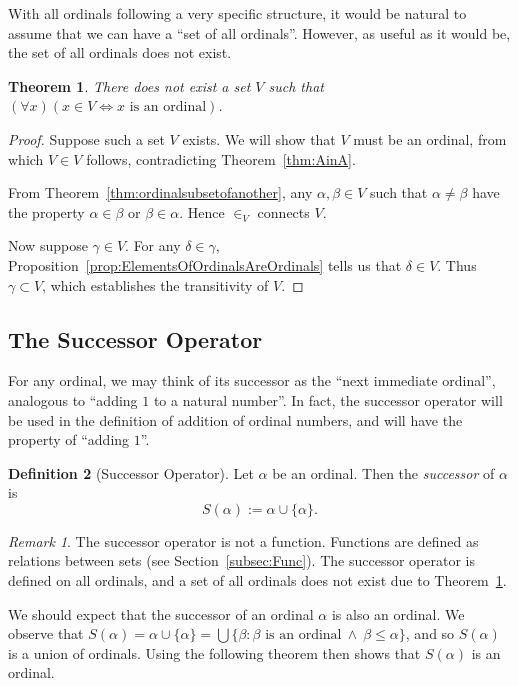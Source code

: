 \documentclass[a4paper,11pt]{article}
\theoremstyle{plain}
\newtheorem{thm}{Theorem}[subsection]
\theoremstyle{definition}
\newtheorem{defn}[thm]{Definition}
\theoremstyle{remark}
\newtheorem*{rem}{Remark}
\begin{document}
With all ordinals following a very specific structure, it would be natural to assume that we can have a ``set of all ordinals''. However, as useful as it would be, the set of all ordinals does not exist.

\begin{thm}
\label{thm:NoOrdinalSet}
There does not exist a set $V$ such that $(\forall x)(x\in V \iff x \text{ is an ordinal})$.
\end{thm}
\begin{proof}
Suppose such a set $V$ exists. We will show that $V$ must be an ordinal, from which $V \in V$ follows, contradicting Theorem~\ref{thm:AinA}.

From Theorem~\ref{thm:ordinalsubsetofanother}, any $\alpha,\beta\in V$ such that $\alpha\neq\beta$ have the property $\alpha \in \beta$ or $\beta\in\alpha$. Hence $\in_V$ connects $V$.

Now suppose $\gamma\in V$. For any $\delta\in\gamma$, Proposition~\ref{prop:ElementsOfOrdinalsAreOrdinals} tells us that $\delta\in V$. Thus $\gamma \subset V$, which establishes the transitivity of $V$.
\end{proof}

\subsection{The Successor Operator}
For any ordinal, we may think of its successor as the ``next immediate ordinal'', analogous to ``adding $1$ to a natural number''. In fact, the successor operator will be used in the definition of addition of ordinal numbers, and will have the property of ``adding $1$''.

\begin{defn}[Successor Operator]
Let $\alpha$ be an ordinal. Then the \textit{successor} of $\alpha$ is
\[S(\alpha) := \alpha \cup \{\alpha\}.\]
\end{defn}
\begin{rem}
The successor operator is not a function. Functions are defined as relations between sets (see Section~\ref{subsec:Func}). The successor operator is defined on all ordinals, and a set of all ordinals does not exist due to Theorem~\ref{thm:NoOrdinalSet}.
\end{rem}

We should expect that the successor of an ordinal $\alpha$ is also an ordinal. We observe that $S(\alpha) = \alpha \cup \{\alpha\} = \bigcup \{\beta : \beta \text{ is an ordinal}\ \land\ \beta\leq\alpha\}$, and so $S(\alpha)$ is a union of ordinals. Using the following theorem then shows that $S(\alpha)$ is an ordinal.
\end{document}
